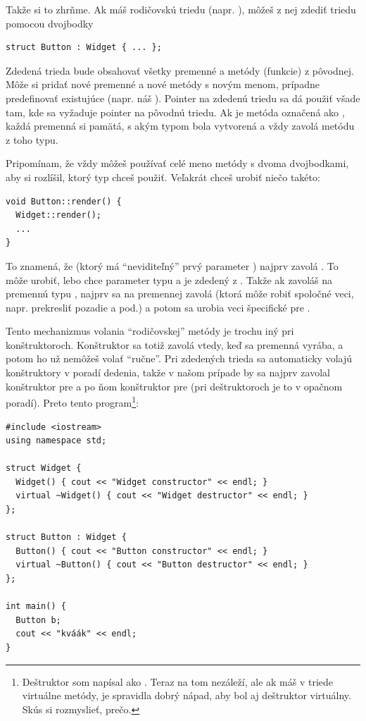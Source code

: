 Takže si to zhrňme. Ak máš rodičovskú triedu (napr. ), môžeš z nej zdediť triedu pomocou dvojbodky

\begin{lstlisting}
struct Button : Widget { ... };
\end{lstlisting}

Zdedená trieda bude obsahovať všetky premenné a metódy (funkcie) z pôvodnej. Môže si pridať nové premenné a nové metódy s novým menom, prípadne 
predefinovať existujúce (napr. náš ). Pointer na zdedenú triedu sa dá použiť 
všade tam, kde sa vyžaduje pointer na pôvodnú triedu.
Ak je metóda označená ako , každá premenná si pamätá, s akým typom bola vytvorená
a vždy zavolá metódu z toho typu.

Pripomínam, že vždy môžeš používať celé meno metódy s dvoma dvojbodkami, aby si rozlíšil, ktorý typ
chceš použiť. Veľakrát chceš urobiť niečo takéto:

\begin{lstlisting}
void Button::render() {
  Widget::render();
  ...
}
\end{lstlisting}

To znamená, že  (ktorý má ``neviditeľný'' prvý parameter )
najprv zavolá \hbox{.} To môže urobiť, lebo  chce parameter
 typu  a 
 je zdedený z . Takže ak zavoláš  na premennú
typu , najprv sa na premennej  zavolá  (ktorá môže
robiť spoločné veci, napr. prekresliť pozadie a pod.) a potom sa urobia veci špecifické pre .

Tento mechanizmus volania ``rodičovskej'' metódy je trochu iný pri konštruktoroch. Konštruktor
sa totiž zavolá vtedy, keď sa premenná vyrába, a potom ho už nemôžeš volať ``ručne''. Pri zdedených
trieda sa automaticky volajú konštruktory v poradí dedenia, takže v našom prípade by sa najprv
zavolal konštruktor pre  a po ňom konštruktor pre  (pri deštruktoroch je to 
v opačnom poradí). Preto tento program\footnote{%
  Deštruktor som napísal ako . Teraz na tom nezáleží, ale ak máš v triede
  virtuálne metódy, je spravidla dobrý nápad, aby bol aj deštruktor virtuálny. Skús si rozmyslieť,
  prečo.
}:

\begin{lstlisting}
#include <iostream>
using namespace std;

struct Widget {
  Widget() { cout << "Widget constructor" << endl; }
  virtual ~Widget() { cout << "Widget destructor" << endl; }
};

struct Button : Widget {
  Button() { cout << "Button constructor" << endl; }
  virtual ~Button() { cout << "Button destructor" << endl; }
};

int main() {
  Button b;
  cout << "kváák" << endl;
}
\end{lstlisting}

